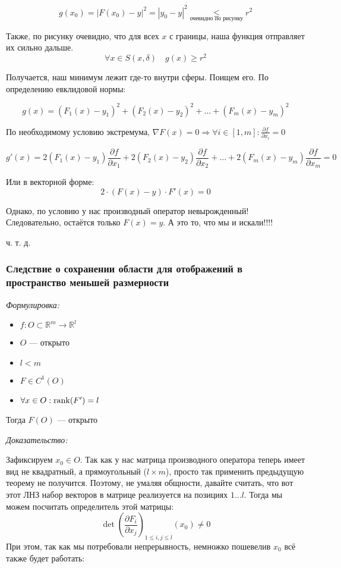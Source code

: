 \documentclass{article}
\begin{document}
\[g(x_0) = |F(x_0) - y|^2 = |y_0 - y|^2 \underset{\text{очевидно по рисунку}}{\le} r^2\]

Также, по рисунку очевидно, что для всех $x$ с границы, наша функция отправляет их сильно дальше.
\[\forall x \in S(x, \delta) \quad g(x) \ge r^2\]

Получается, наш минимум лежит где-то внутри сферы. Поищем его. По определению евклидовой нормы:

\[g(x) = (F_1(x) - y_1)^2 + (F_2(x) - y_2)^2 + \ldots + (F_m(x) - y_m)^2\]

По необходимому условию экстремума, $\nabla F(x) = 0 \Rightarrow \forall i \in [1, m]: \frac{\partial f}{\partial x_i} = 0$

\[g'(x) = 2(F_1(x) - y_1)\frac{\partial f}{\partial x_1} + 2(F_2(x) - y_2)\frac{\partial f}{\partial x_2} + \ldots + 2(F_m(x) - y_m)\frac{\partial f}{\partial x_m} = 0\]

Или в векторной форме:
\[2 \cdot (F(x) - y) \cdot F'(x) = 0\]

Однако, по условию у нас производный оператор невырожденный! Следовательно, остаётся только $F(x) = y$. А это то, что мы и искали!!!!

ч. т. д.


\subsubsection{Следствие о сохранении области для отображений в пространство меньшей размерности}
\textit{Формулировка:}

\begin{itemize}
    \item $f: O \subset \mathbb{R}^m \rightarrow \mathbb{R}^l$
    \item $O$ --- открыто
    \item $l < m$    
    \item $F \in C^1(O)$
    \item $\forall x \in O: \rank(F') = l$
\end{itemize}

Тогда $F(O)$ --- открыто

\textit{Доказательство:}

Зафиксируем $x_0 \in O$. Так как у нас матрица производного оператора теперь имеет вид не квадратный, а прямоугольный ($l \times m$), просто так применить предыдущую теорему не получится. Поэтому, не умаляя общности, давайте считать, что вот этот ЛНЗ набор векторов в матрице реализуется на позициях $1 \ldots l$.
Тогда мы можем посчитать определитель этой матрицы: $$\det \left(\frac{\partial F_i}{\partial x_j}\right)_{1 \le i, j \le l}(x_0) \neq 0$$
При этом, так как мы потребовали непрерывность, немножко пошевелив $x_0$ всё также будет работать:
\end{document}
